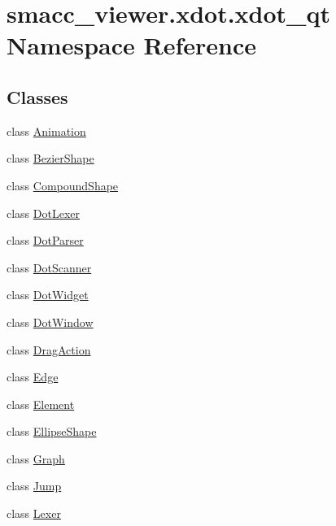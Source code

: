 \hypertarget{namespacesmacc__viewer_1_1xdot_1_1xdot__qt}{}\section{smacc\+\_\+viewer.\+xdot.\+xdot\+\_\+qt Namespace Reference}
\label{namespacesmacc__viewer_1_1xdot_1_1xdot__qt}
\subsection*{Classes}
\begin{DoxyCompactItemize}
\item 
class \hyperlink{classsmacc__viewer_1_1xdot_1_1xdot__qt_1_1Animation}{Animation}
\item 
class \hyperlink{classsmacc__viewer_1_1xdot_1_1xdot__qt_1_1BezierShape}{Bezier\+Shape}
\item 
class \hyperlink{classsmacc__viewer_1_1xdot_1_1xdot__qt_1_1CompoundShape}{Compound\+Shape}
\item 
class \hyperlink{classsmacc__viewer_1_1xdot_1_1xdot__qt_1_1DotLexer}{Dot\+Lexer}
\item 
class \hyperlink{classsmacc__viewer_1_1xdot_1_1xdot__qt_1_1DotParser}{Dot\+Parser}
\item 
class \hyperlink{classsmacc__viewer_1_1xdot_1_1xdot__qt_1_1DotScanner}{Dot\+Scanner}
\item 
class \hyperlink{classsmacc__viewer_1_1xdot_1_1xdot__qt_1_1DotWidget}{Dot\+Widget}
\item 
class \hyperlink{classsmacc__viewer_1_1xdot_1_1xdot__qt_1_1DotWindow}{Dot\+Window}
\item 
class \hyperlink{classsmacc__viewer_1_1xdot_1_1xdot__qt_1_1DragAction}{Drag\+Action}
\item 
class \hyperlink{classsmacc__viewer_1_1xdot_1_1xdot__qt_1_1Edge}{Edge}
\item 
class \hyperlink{classsmacc__viewer_1_1xdot_1_1xdot__qt_1_1Element}{Element}
\item 
class \hyperlink{classsmacc__viewer_1_1xdot_1_1xdot__qt_1_1EllipseShape}{Ellipse\+Shape}
\item 
class \hyperlink{classsmacc__viewer_1_1xdot_1_1xdot__qt_1_1Graph}{Graph}
\item 
class \hyperlink{classsmacc__viewer_1_1xdot_1_1xdot__qt_1_1Jump}{Jump}
\item 
class \hyperlink{classsmacc__viewer_1_1xdot_1_1xdot__qt_1_1Lexer}{Lexer}
\item 

\end{DoxyCompactItemize}
